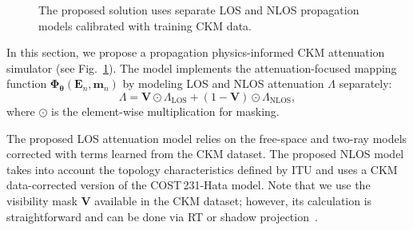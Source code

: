 \documentclass[10pt,conference,letterpaper]{IEEEtran}
\begin{document}
\begin{figure}[t]
\centering
{}
\caption{The proposed solution uses separate LOS and NLOS propagation models calibrated with training CKM data.}
\label{fig:CKM_model}
\vspace{-0.5cm}
\end{figure}

In this section, we propose a propagation physics-informed CKM attenuation simulator (see Fig.~\ref{fig:CKM_model}). The model implements the attenuation-focused mapping function $\mathbf{\Phi}_{\boldsymbol{\theta}}(\mathbf{E}_n, \mathbf{m}_n)$ by modeling LOS and NLOS attenuation $\Lambda$ separately:
\begin{equation}
\Lambda=\mathbf{V} \odot \Lambda_\text{LOS} + (1-\mathbf{V}) \odot \Lambda_\text{NLOS},
\label{eq:combined}
\end{equation}
where $\odot$ is the element-wise multiplication for masking. 

The proposed LOS attenuation model relies on the free-space and two-ray models corrected with terms learned from the CKM dataset. The proposed NLOS model takes into account the topology characteristics defined by ITU and uses a CKM data-corrected version of the COST\,231-Hata model. Note that we use the visibility mask $\mathbf{V}$ available in the CKM dataset; however, its calculation is straightforward and can be done via RT or shadow projection~\cite{vinogradov2026shadow,vinogradov2026upsim}.
\end{document}
